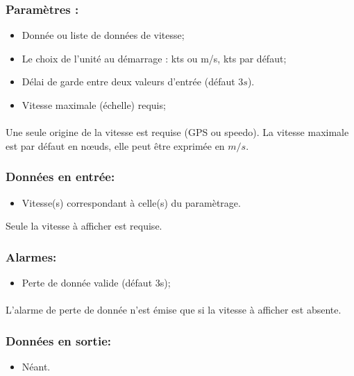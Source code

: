 \documentclass[a4paper,11pt]{report}
\begin{document}
\subsubsection{ Paramètres :}
\begin{itemize}
	\item Donnée ou liste de données de vitesse;
	\item Le choix de l'unité au démarrage : kts ou m/s, kts par défaut;
	\item Délai de garde entre deux valeurs d'entrée (défaut $3s$).
    \item Vitesse maximale (échelle) requis;
\end{itemize}
\paragraph{}
Une seule origine de la vitesse est requise (GPS ou speedo).
La vitesse maximale est par défaut en nœuds, elle peut être exprimée en $m/s$.

\subsubsection{Données en entrée:}
\begin{itemize}
	\item Vitesse(s) correspondant à celle(s) du paramètrage.
\end{itemize}
Seule la vitesse à afficher est requise.

\subsubsection{Alarmes:}
\begin{itemize}
	\item Perte de donnée valide (défaut 3s);
\end{itemize}
\paragraph{}
L'alarme de perte de donnée n'est émise que
si la vitesse à afficher est absente.

\subsubsection{Données en sortie:}
\begin{itemize}
	\item Néant.
\end{itemize}
\end{document}
